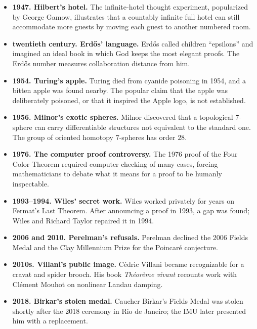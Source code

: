 \begin{itemize}
              from becoming a constitutional debate.
        \item \textbf{1947. Hilbert's hotel.} The infinite-hotel thought
              experiment, popularized by George Gamow, illustrates that a
              countably infinite full hotel can still accommodate more guests
              by moving each guest to another numbered room.
        \item \textbf{twentieth century. Erd\H{o}s' language.} Erd\H{o}s called children
              ``epsilons'' and imagined an ideal book in which God keeps the
              most elegant proofs. The Erd\H{o}s number measures collaboration
              distance from him.
        \item \textbf{1954. Turing's apple.} Turing died from cyanide poisoning in
              1954, and a bitten apple was found nearby. The popular claim that
              the apple was deliberately poisoned, or that it inspired the
              Apple logo, is not established.
        \item \textbf{1956. Milnor's exotic spheres.} Milnor discovered that a
              topological $7$-sphere can carry differentiable structures not
              equivalent to the standard one. The group of oriented homotopy
              $7$-spheres has order $28$.
        \item \textbf{1976. The computer proof controversy.} The 1976 proof of the
              Four Color Theorem required computer checking of many cases,
              forcing mathematicians to debate what it means for a proof to be
              humanly inspectable.
        \item \textbf{1993--1994. Wiles' secret work.} Wiles worked privately for years on
              Fermat's Last Theorem. After announcing a proof in 1993, a gap was
              found; Wiles and Richard Taylor repaired it in 1994.
        \item \textbf{2006 and 2010. Perelman's refusals.} Perelman declined the 2006 Fields
              Medal and the Clay Millennium Prize for the Poincaré conjecture.
        \item \textbf{2010s. Villani's public image.} Cédric Villani became recognizable
              for a cravat and spider brooch. His book
              \textit{Théorème vivant} recounts work with Clément Mouhot on
              nonlinear Landau damping.
        \item \textbf{2018. Birkar's stolen medal.} Caucher Birkar's Fields Medal was
              stolen shortly after the 2018 ceremony in Rio de Janeiro; the IMU
              later presented him with a replacement.
    \end{itemize}

